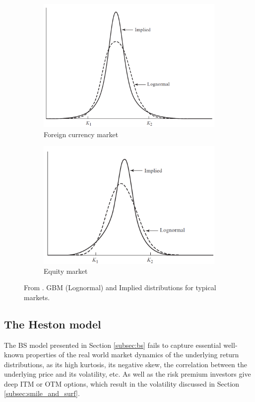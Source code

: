 \documentclass[12,twoside]{mammeTFM}
\theoremstyle{definition}
\theoremstyle{remark}
\begin{document}
\begin{figure}
\centering
\begin{subfigure}{.5\textwidth}
  \centering
  \includegraphics[width=.8\linewidth]{Media/currency_distribution.PNG}
  \caption{Foreign currency market}
\end{subfigure}%
\begin{subfigure}{.5\textwidth}
  \centering
  \includegraphics[width=.9\linewidth]{Media/equity_distribution.PNG}
  \caption{Equity market}
\end{subfigure}
\caption{From \cite{hul09}. GBM (Lognormal) and Implied distributions for typical markets.}
\label{fig:implied_distribution}
\end{figure}

\subsection{The Heston model} \label{chap:heston_model}

The BS model presented in Section \ref{subsec:bs} fails to capture essential well-known properties of the real world market dynamics of the underlying return distributions, as its high kurtosis, its negative skew, the correlation between the underlying price and its volatility, etc. As well as the risk premium investors give deep ITM or OTM options, which result in the volatility discussed in Section \ref{subsec:smile_and_surf}.
\end{document}
